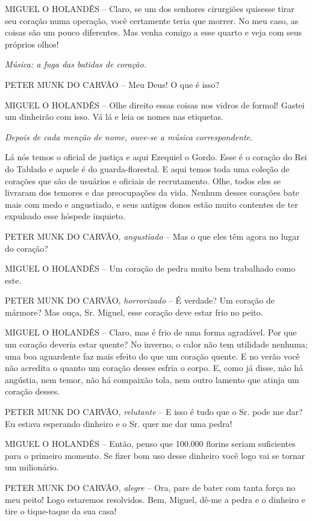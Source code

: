 MIGUEL O HOLANDÊS -- Claro, se um dos senhores cirurgiões quisesse tirar
seu coração numa operação, você certamente teria que morrer. No meu
caso, as coisas são um pouco diferentes. Mas venha comigo a esse quarto
e veja com seus próprios olhos!

\emph{Música: a fuga das batidas de coração.}

PETER MUNK DO CARVÃO -- Meu Deus! O que é isso?

MIGUEL O HOLANDÊS -- Olhe direito essas coisas nos vidros de formol!
Gastei um dinheirão com isso. Vá lá e leia os nomes nas etiquetas.

\emph{Depois de cada menção de nome, ouve-se a música correspondente.}

Lá nós temos o oficial de justiça e aqui Ezequiel o Gordo. Esse é o
coração do Rei do Tablado e aquele é do guarda-florestal. E aqui temos
toda uma coleção de corações que são de usuários e oficiais de
recrutamento. Olhe, todos eles se livraram dos temores e das
preocupações da vida. Nenhum desses corações bate mais com medo e
angustiado, e seus antigos donos estão muito contentes de ter expulsado
esse hóspede inquieto.

PETER MUNK DO CARVÃO, \emph{angustiado} -- Mas o que eles têm agora no
lugar do coração?

MIGUEL O HOLANDÊS -- Um coração de pedra muito bem trabalhado como este.

PETER MUNK DO CARVÃO, \emph{horrorizado} -- É verdade? Um coração de
mármore? Mas ouça, Sr. Miguel, esse coração deve estar frio no peito.

MIGUEL O HOLANDÊS -- Claro, mas é frio de uma forma agradável. Por que
um coração deveria estar quente? No inverno, o calor não tem utilidade
nenhuma; uma boa aguardente faz mais efeito do que um coração quente. E
no verão você não acredita o quanto um coração desses esfria o corpo. E,
como já disse, não há angústia, nem temor, não há compaixão tola, nem
outro lamento que atinja um coração desses.

PETER MUNK DO CARVÃO, \emph{relutante} -- E isso é tudo que o Sr. pode
me dar? Eu estava esperando dinheiro e o Sr. quer me dar uma pedra!

MIGUEL O HOLANDÊS -- Então, penso que 100.000 florins seriam suficientes
para o primeiro momento. Se fizer bom uso desse dinheiro você logo vai
se tornar um milionário.

PETER MUNK DO CARVÃO, \emph{alegre} -- Ora, pare de bater com tanta
força no meu peito! Logo estaremos resolvidos. Bem, Miguel, dê-me a
pedra e o dinheiro e tire o tique-taque da sua casa!

